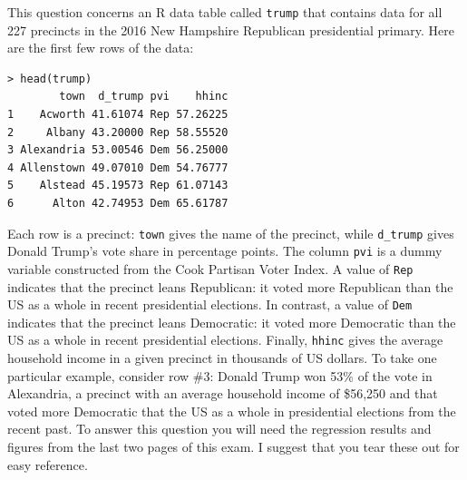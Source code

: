\documentclass[addpoints,12pt]{exam}
\begin{document}
\begin{questions}
\question This question concerns an R data table called \texttt{trump} that contains data for all 227 precincts in the 2016 New Hampshire Republican presidential primary.
Here are the first few rows of the data:
\begin{verbatim}
> head(trump)
        town  d_trump pvi    hhinc
1    Acworth 41.61074 Rep 57.26225
2     Albany 43.20000 Rep 58.55520
3 Alexandria 53.00546 Dem 56.25000
4 Allenstown 49.07010 Dem 54.76777
5    Alstead 45.19573 Rep 61.07143
6      Alton 42.74953 Dem 65.61787
\end{verbatim}
Each row is a precinct: \texttt{town} gives the name of the precinct, while \texttt{d\_trump} gives Donald Trump's vote share in percentage points.
The column \texttt{pvi} is a dummy variable constructed from the Cook Partisan Voter Index.
A value of \texttt{Rep} indicates that the precinct leans Republican: it voted more Republican than the US as a whole in recent presidential elections.
In contrast, a value of \texttt{Dem} indicates that the precinct leans Democratic: it voted more Democratic than the US as a whole in recent presidential elections.
Finally, \texttt{hhinc} gives the average household income in a given precinct in thousands of US dollars.
To take one particular example, consider row \#3: Donald Trump won 53\% of the vote in Alexandria, a precinct with an average household income of \$56,250 and that voted more Democratic that the US as a whole in presidential elections from the recent past.
To answer this question you will need the regression results and figures from the last two pages of this exam.
I suggest that you tear these out for easy reference.
\end{questions}
\end{document}
